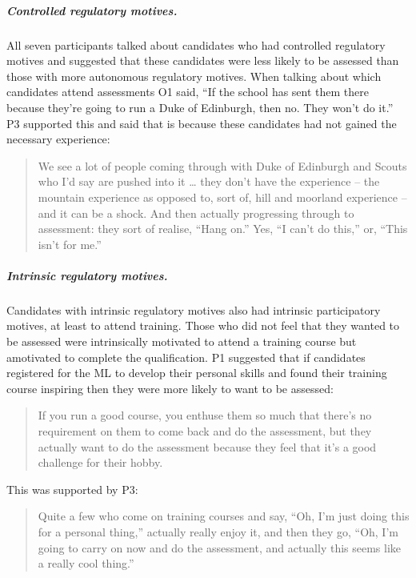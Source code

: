 \documentclass[a4paper,]{book}
\let\oldsubparagraph\subparagraph
\renewcommand{\subparagraph}[1]{\oldsubparagraph{#1}\mbox{}}
\begin{document}
\hypertarget{controlled-regulatory-motives.}{%
\subparagraph{Controlled regulatory motives.}\label{controlled-regulatory-motives.}}

All seven participants talked about candidates who had controlled regulatory motives and suggested that these candidates were less likely to be assessed than those with more autonomous regulatory motives. When talking about which candidates attend assessments O1 said, ``If the school has sent them there because they're going to run a Duke of Edinburgh, then no. They won't do it.'' P3 supported this and said that is because these candidates had not gained the necessary experience:

\begin{quote}
We see a lot of people coming through with Duke of Edinburgh and Scouts who I'd say are pushed into it \ldots{} they don't have the experience -- the mountain experience as opposed to, sort of, hill and moorland experience -- and it can be a shock. And then actually progressing through to assessment: they sort of realise, ``Hang on.'' Yes, ``I can't do this,'' or, ``This isn't for me.''
\end{quote}

\hypertarget{intrinsic-regulatory-motives.}{%
\subparagraph{Intrinsic regulatory motives.}\label{intrinsic-regulatory-motives.}}

Candidates with intrinsic regulatory motives also had intrinsic participatory motives, at least to attend training. Those who did not feel that they wanted to be assessed were intrinsically motivated to attend a training course but amotivated to complete the qualification. P1 suggested that if candidates registered for the ML to develop their personal skills and found their training course inspiring then they were more likely to want to be assessed:

\begin{quote}
If you run a good course, you enthuse them so much that there's no requirement on them to come back and do the assessment, but they actually want to do the assessment because they feel that it's a good challenge for their hobby.
\end{quote}

This was supported by P3:

\begin{quote}
Quite a few who come on training courses and say, ``Oh, I'm just doing this for a personal thing,'' actually really enjoy it, and then they go, ``Oh, I'm going to carry on now and do the assessment, and actually this seems like a really cool thing.''
\end{quote}
\end{document}
